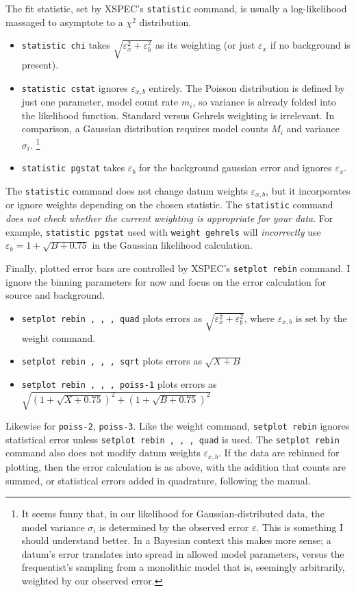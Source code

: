 \documentclass[onecolumn,tighten]{aastex6}
\newcommand*{\code}{\texttt}
\begin{document}
The fit statistic, set by XSPEC's \code{statistic} command,
is usually a log-likelihood massaged to asymptote to a $\chi^2$ distribution.
\begin{itemize}
  \item \code{statistic chi} takes $\sqrt{ \varepsilon_x^2 + \varepsilon_b^2 }$ as its weighting (or just $\varepsilon_x$ if no background is present).
  \item \code{statistic cstat} ignores $\varepsilon_{x,b}$ entirely.  The Poisson distribution is defined by just one parameter, model count rate $m_i$, so variance is already folded into the likelihood function.
      Standard versus Gehrels weighting is irrelevant.
In comparison, a Gaussian distribution requires model counts $M_i$ and variance $\sigma_i$.
\footnote{It seems funny that, in our likelihood for Gaussian-distributed data, the model variance $\sigma_i$ is determined by the observed error $\varepsilon$.
  This is something I should understand better.  In a Bayesian context this
  makes more sense; a datum's error translates into spread in allowed model
  parameters, versus the frequentist's sampling from a monolithic model that
  is, seemingly arbitrarily, weighted by our observed error.}
  \item \code{statistic pgstat} takes $\varepsilon_b$ for the background gaussian error and ignores $\varepsilon_x$.
\end{itemize}
The \code{statistic} command does not change datum weights $\varepsilon_{x,b}$,
but it incorporates or ignore weights depending on the chosen statistic.
The \code{statistic} command \emph{does not check whether the current weighting
is appropriate for your data}.
For example, \code{statistic pgstat} used with \code{weight gehrels} will
\emph{incorrectly} use $\varepsilon_b = 1 + \sqrt{B + 0.75}$ in the Gaussian
likelihood calculation.

Finally, plotted error bars are controlled by XSPEC's \code{setplot rebin} command.
I ignore the binning parameters for now and focus on the error calculation for source and background.
\begin{itemize}
  \item \code{setplot rebin , , , quad} plots errors as $\sqrt{ \varepsilon_{x}^2 + \varepsilon_{b}^2 }$, where $\varepsilon_{x,b}$ is set by the weight command.
  \item \code{setplot rebin , , , sqrt} plots errors as $\sqrt{ X + B }$
  \item \code{setplot rebin , , , poiss-1} plots errors as $\sqrt{ \left( 1 + \sqrt{X + 0.75} \right)^2 + \left( 1 + \sqrt{B + 0.75} \right)^2 }$
\end{itemize}
Likewise for \code{poiss-2}, \code{poiss-3}.
Like the weight command, \code{setplot rebin} ignores statistical error unless
\code{setplot rebin , , , quad} is used.
The \code{setplot rebin} command also does not modify datum weights $\varepsilon_{x,b}$.
If the data are rebinned for plotting, then the error calculation is as above,
with the addition that counts are summed, or statistical errors added in
quadrature, following the manual.
\end{document}
